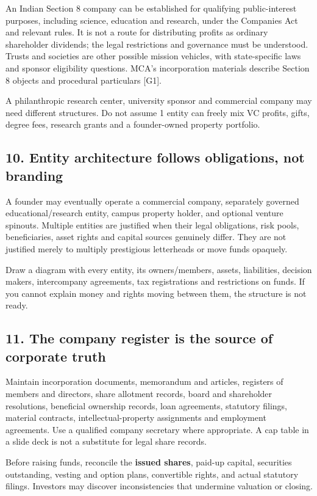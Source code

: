 An Indian Section 8 company can be established for qualifying public-interest purposes, including science, education and research, under the Companies Act and relevant rules. It is not a route for distributing profits as ordinary shareholder dividends; the legal restrictions and governance must be understood. Trusts and societies are other possible mission vehicles, with state-specific laws and sponsor eligibility questions. MCA's incorporation materials describe Section 8 objects and procedural particulars [G1].

A philanthropic research center, university sponsor and commercial company may need different structures. Do not assume 1 entity can freely mix VC profits, gifts, degree fees, research grants and a founder-owned property portfolio.

\subsection{10. Entity architecture follows obligations, not branding}

A founder may eventually operate a commercial company, separately governed educational/research entity, campus property holder, and optional venture spinouts. Multiple entities are justified when their legal obligations, risk pools, beneficiaries, asset rights and capital sources genuinely differ. They are not justified merely to multiply prestigious letterheads or move funds opaquely.

Draw a diagram with every entity, its owners/members, assets, liabilities, decision makers, intercompany agreements, tax registrations and restrictions on funds. If you cannot explain money and rights moving between them, the structure is not ready.

\subsection{11. The company register is the source of corporate truth}

Maintain incorporation documents, memorandum and articles, registers of members and directors, share allotment records, board and shareholder resolutions, beneficial ownership records, loan agreements, statutory filings, material contracts, intellectual-property assignments and employment agreements. Use a qualified company secretary where appropriate. A cap table in a slide deck is not a substitute for legal share records.

Before raising funds, reconcile the \textbf{issued shares}, paid-up capital, securities outstanding, vesting and option plans, convertible rights, and actual statutory filings. Investors may discover inconsistencies that undermine valuation or closing.

